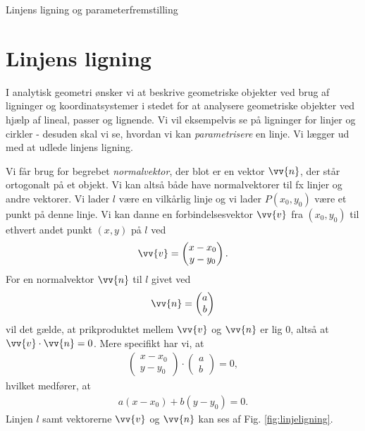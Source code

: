 \begin{center}
\Huge
Linjens ligning og parameterfremstilling
\end{center}


\section*{Linjens ligning}

I analytisk geometri ønsker vi at beskrive geometriske objekter ved brug af ligninger og koordinatsystemer i stedet for at analysere geometriske objekter ved hjælp af lineal, passer og lignende. Vi vil eksempelvis se på ligninger for linjer og cirkler - desuden skal vi se, hvordan vi kan \textit{parametrisere} en linje. Vi lægger ud med at udlede linjens ligning.

Vi får brug for begrebet \textit{normalvektor}, der blot er en vektor $\vv{n}$, der står ortogonalt på et objekt. Vi kan altså både have normalvektorer til fx linjer og andre vektorer. 
Vi lader $l$ være en vilkårlig linje og vi lader $P(x_0,y_0)$ være et punkt på denne linje. Vi kan danne en forbindelsesvektor $\vv{v}$ fra $(x_0,y_0)$ til ethvert andet punkt $(x,y)$ på $l$ ved
\begin{align}\label{eq:eq1}
\vv{v} = \begin{pmatrix}
x-x_0\\y-y_0
\end{pmatrix}.
\end{align}
For en normalvektor $\vv{n}$ til $l$ givet ved
\begin{align*}
	\vv{n} = 
	\begin{pmatrix}
		a\\b
	\end{pmatrix}
\end{align*}
vil det gælde, at prikproduktet mellem $\vv{v}$ og $\vv{n}$ er lig 0, altså at $\vv{v}\cdot \vv{n} = 0$. Mere specifikt har vi, at 
\begin{align*}
	\begin{pmatrix}
		x-x_0\\ y-y_0
	\end{pmatrix} \cdot 
	\begin{pmatrix}
		a \\ b
	\end{pmatrix} = 0,
\end{align*}
hvilket medfører, at 
\begin{align*}
a(x-x_0) + b(y-y_0) = 0.
\end{align*}
Linjen $l$ samt vektorerne $\vv{v}$ og $\vv{n}$ kan ses af Fig. \ref{fig:linjeligning}.
